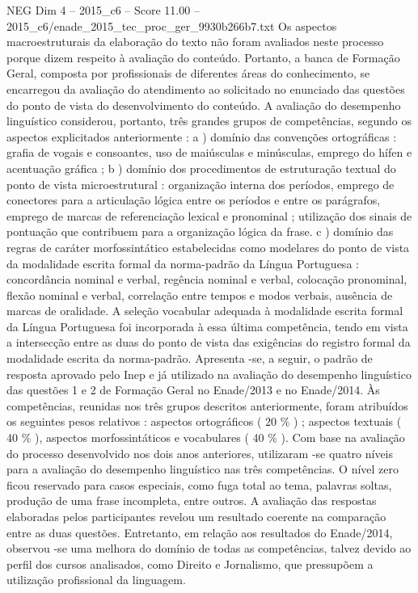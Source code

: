 \begin{textsample}{NEG Dim 4 – 2015\_c6 – Score 11.00 – 2015\_c6/enade\_2015\_tec\_proc\_ger\_9930b266b7.txt}
Os aspectos macroestruturais da elaboração do texto não foram avaliados neste processo porque dizem respeito à avaliação do conteúdo.
Portanto, a banca de Formação Geral, composta por profissionais de diferentes áreas do conhecimento, se encarregou da avaliação do atendimento ao solicitado no enunciado das questões do ponto de vista do desenvolvimento do conteúdo.
A avaliação do desempenho linguístico considerou, portanto, três grandes grupos de competências, segundo os aspectos explicitados anteriormente : a ) domínio das convenções ortográficas : grafia de vogais e consoantes, uso de maiúsculas e minúsculas, emprego do hífen e acentuação gráfica ; b ) domínio dos procedimentos de estruturação textual do ponto de vista microestrutural : organização interna dos períodos, emprego de conectores para a articulação lógica entre os períodos e entre os parágrafos, emprego de marcas de referenciação lexical e pronominal ; utilização dos sinais de pontuação que contribuem para a organização lógica da frase. c ) domínio das regras de caráter morfossintático estabelecidas como modelares do ponto de vista da modalidade escrita formal da norma-padrão da Língua Portuguesa : concordância nominal e verbal, regência nominal e verbal, colocação pronominal, flexão nominal e verbal, correlação entre tempos e modos verbais, ausência de marcas de oralidade.
A seleção vocabular adequada à modalidade escrita formal da Língua Portuguesa foi incorporada à essa última competência, tendo em vista a intersecção entre as duas do ponto de vista das exigências do registro formal da modalidade escrita da norma-padrão.
Apresenta -se, a seguir, o padrão de resposta aprovado pelo Inep e já utilizado na avaliação do desempenho linguístico das questões 1 e 2 de Formação Geral no Enade/2013 e no Enade/2014.
Às competências, reunidas nos três grupos descritos anteriormente, foram atribuídos os seguintes pesos relativos : aspectos ortográficos ( 20 \% ) ; aspectos textuais ( 40 \% ), aspectos morfossintáticos e vocabulares ( 40 \% ).
Com base na avaliação do processo desenvolvido nos dois anos anteriores, utilizaram -se quatro níveis para a avaliação do desempenho linguístico nas três competências.
O nível zero ficou reservado para casos especiais, como fuga total ao tema, palavras soltas, produção de uma frase incompleta, entre outros.
A avaliação das respostas elaboradas pelos participantes revelou um resultado coerente na comparação entre as duas questões.
Entretanto, em relação aos resultados do Enade/2014, observou -se uma melhora do domínio de todas as competências, talvez devido ao perfil dos cursos analisados, como Direito e Jornalismo, que pressupõem a utilização profissional da linguagem.

\end{textsample}
